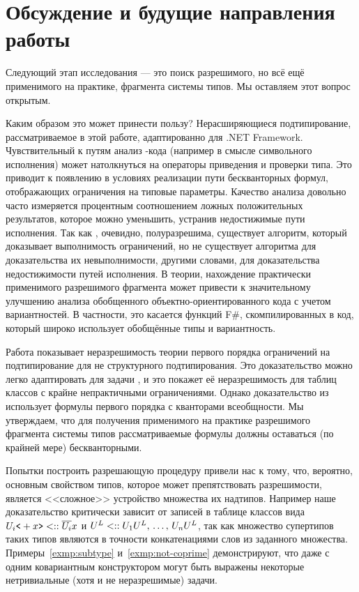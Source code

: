 \section{Обсуждение и будущие направления работы}

Следующий этап исследования --- это поиск разрешимого, но всё ещё применимого на практике, фрагмента системы типов. Мы оставляем этот вопрос открытым.

Каким образом это может принести пользу? Нерасширяющиеся подтипирование, рассматриваемое в этой работе, адаптированно для .NET Framework. Чувствительный к путям анализ \dotnet-кода (например в смысле символьного исполнения) может натолкнуться на операторы приведения и проверки типа. Это приводит к появлению в условиях реализации пути бескванторных формул, отображающих ограничения на типовые параметры. Качество анализа довольно часто измеряется процентным соотношением ложных положительных результатов, которое можно уменьшить, устранив недостижимые пути исполнения. Так как \subtypesat{}, очевидно, полуразрешима, существует алгоритм, который доказывает выполнимость ограничений, но не существует алгоритма для доказательства их невыполнимости, другими словами, для доказательства недостижимости путей исполнения. В теории, нахождение практически применимого разрешимого фрагмента может привести к значительному улучшению анализа обобщенного объектно-ориентированного кода с учетом вариантностей. В частности, это касается функций F\#, скомпилированных в код, который широко использует обобщённые типы и вариантность.

Работа \cite{su2002first} показывает неразрешимость теории первого порядка ограничений на подтипирование для не структурного подтипирования. Это доказательство можно легко адаптировать для задачи \subtypesat{}, и это покажет её неразрешимость для таблиц классов с крайне непрактичными ограничениями. Однако доказательство из~\cite{su2002first} использует формулы первого порядка с кванторами всеобщности. Мы утверждаем, что для получения применимого на практике разрешимого фрагмента системы типов рассматриваемые формулы должны оставаться (по крайней мере) бескванторными.

Попытки построить разрешающую процедуру привели нас к тому, что, вероятно, основным свойством типов, которое может препятствовать разрешимости, является <<сложное>> устройство множества их надтипов. Например наше доказательство критически зависит от записей в таблице классов вида ${U}_{i}\texttt{<}+x\texttt{>} <:: \overline{{U}_{i}}{x}$ и ${U}^{L} <:: {U}_{1}{U}^{L}, \, \ldots, \, {U}_{n}{U}^{L}$, так как множество супертипов таких типов являются в точности конкатенациями слов из заданного множества. Примеры~\ref{exmp:subtype} и~\ref{exmp:not-coprime} демонстрируют, что даже с одним ковариантным конструктором могут быть выражены некоторые нетривиальные (хотя и не неразрешимые) задачи.

